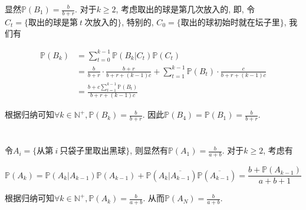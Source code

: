 \documentclass[8pt]{article}
\theoremstyle{compact}
\def\ge{\geqslant}
\def\P#1{\mathbb{P}\left({#1}\right)}
\begin{document}
	显然$\P{B_1} = \frac{b}{b+r}$. 对于$k \ge 2$, 考虑取出的球是第几次放入的, 即, 令$C_t = \{\mbox{取出的球是第}\ t \ \mbox{次放入的}\}$, 特别的, $C_0 = \{\mbox{取出的球初始时就在坛子里}\}$, 我们有

	\begin{align*}
		\P{B_k} &= \sum_{t=0}^{k-1}\P{B_k|C_t}\P{C_t} \\&= \frac{b}{b+r}\cdot\frac{b+r}{b+r+(k-1)c} + \sum_{t=1}^{k-1}\P{B_t}\cdot\frac{c}{b+r+(k-1)c} \\&= \frac{b + c\sum_{t=1}^{k-1}\P{B_t}}{b+r+(k-1)c}		
	\end{align*}

	根据归纳可知$\forall k \in \mathbb N^+, \P{B_k} = \frac{b}{b+r}$. 因此$\P{B_4} = \P{B_1} = \frac{b}{b+r}.$
\section{}

	令$A_i = \{\mbox{从第}\ i\ \mbox{只袋子里取出黑球}\}$, 则显然有$\P{A_1} = \frac{b}{a+b}$. 对于$k \ge 2$, 考虑有

	$$\P{A_k} = \P{A_k | A_{k-1}} \P{A_{k-1}} + \P{A_k | \overline{A_{k-1}}} \P{\overline{A_{k-1}}} = \frac{b + \P{A_{k-1}}}{a+b+1}$$

	根据归纳可知$\forall k \in \mathbb N^+, \P{A_k} = \frac{b}{a+b}$. 从而$\P{A_N} = \frac{b}{a+b}$.
\end{document}

